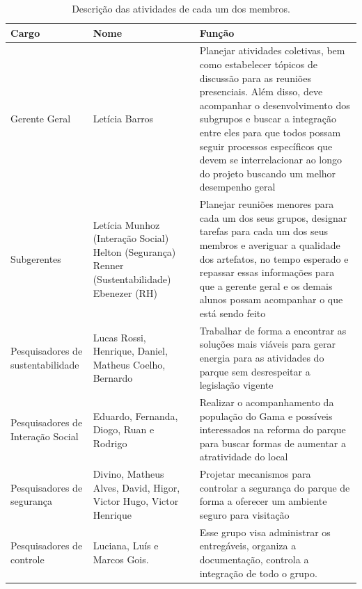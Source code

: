 \begin{table}[H]
\caption{Descri\c{c}\~ao das atividades de cada um dos membros.} 
\begin{center}
\begin{tabular}{|p{3cm}|p{4cm}|p{8cm}|} \hline

Cargo &Nome &Fun\c{c}\~ao\\ \hline 

Gerente Geral &Let\'icia Barros &Planejar atividades coletivas, bem como estabelecer t\'opicos de discuss\~ao para as reuni\~oes presenciais. Al\'em disso, deve acompanhar o desenvolvimento dos subgrupos e buscar a integra\c{c}\~ao entre eles para que todos possam seguir processos espec\'ificos que devem se interrelacionar ao longo do projeto buscando um melhor desempenho geral \\ \hline

Subgerentes &Let\'icia Munhoz (Intera\c{c}\~ao Social)  Helton (Seguran\c{c}a)  Renner (Sustentabilidade)  Ebenezer (RH) &Planejar reuni\~oes menores para cada um dos seus grupos, designar tarefas para cada um dos seus membros e averiguar a qualidade dos artefatos, no tempo esperado e repassar essas informa\c{c}\~oes para que a gerente geral e os demais alunos possam acompanhar o que est\'a sendo feito \\ \hline

Pesquisadores de sustentabilidade &Lucas Rossi, Henrique, Daniel, Matheus Coelho, Bernardo &Trabalhar de forma a encontrar as solu\c{c}\~oes mais vi\'aveis para gerar energia para as atividades do parque sem desrespeitar a legisla\c{c}\~ao vigente \\ \hline
Pesquisadores de Intera\c{c}\~ao Social &Eduardo, Fernanda, Diogo, Ruan e Rodrigo &Realizar o acompanhamento da popula\c{c}\~ao do Gama e poss\'iveis interessados na reforma do parque para buscar formas de aumentar a atratividade do local \\ \hline 

Pesquisadores de seguran\c{c}a &Divino, Matheus Alves, David, Higor, Victor Hugo, Victor Henrique &Projetar mecanismos para controlar a seguran\c{c}a do parque de forma a oferecer um ambiente seguro para visita\c{c}\~ao \\ \hline

Pesquisadores de controle &Luciana, Lu\'is e Marcos Gois. &Esse grupo visa administrar os entreg\'aveis, organiza a documenta\c{c}\~ao, controla a integra\c{c}\~ao de todo o grupo. \\ \hline

 \end{tabular}
\end{center}
\end{table}


